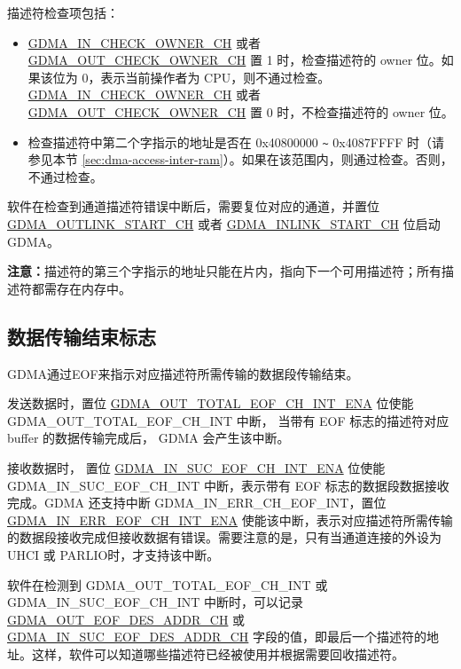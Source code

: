 \documentclass[main\_\_CN.tex]{subfiles}
\begin{document}
描述符检查项包括：
\begin{itemize}
    \item \hyperref[fielddesc:GDMAINCHECKOWNERCHN]{GDMA\_IN\_CHECK\_OWNER\_CH} 或者 \hyperref[fielddesc:GDMAOUTCHECKOWNERCHN]{GDMA\_OUT\_CHECK\_OWNER\_CH} 置 1 时，检查描述符的 owner 位。如果该位为 0，表示当前操作者为 CPU，则不通过检查。\hyperref[fielddesc:GDMAINCHECKOWNERCHN]{GDMA\_IN\_CHECK\_OWNER\_CH} 或者 \hyperref[fielddesc:GDMAOUTCHECKOWNERCHN]{GDMA\_OUT\_CHECK\_OWNER\_CH} 置 0 时，不检查描述符的 owner 位。\\

    \item 检查描述符中第二个字指示的地址是否在 0x40800000 \verb+~+ 0x4087FFFF 时（请参见本节 \ref{sec:dma-access-inter-ram}）。如果在该范围内，则通过检查。否则，不通过检查。\\
\end{itemize}

软件在检查到通道描述符错误中断后，需要复位对应的通道，并置位 \hyperref[fielddesc:GDMAOUTLINKSTARTCHN]{GDMA\_OUTLINK\_START\_CH} 或者  \hyperref[fielddesc:GDMAINLINKSTARTCHN]{GDMA\_INLINK\_START\_CH} 位启动 GDMA。

{\bfseries 注意：}描述符的第三个字指示的地址只能在片内，指向下一个可用描述符；所有描述符都需存在内存中。


\subsection{数据传输结束标志}

GDMA通过EOF来指示对应描述符所需传输的数据段传输结束。

发送数据时，置位 \hyperref[fielddesc:GDMAOUTTOTALEOFCHNINTENA]{GDMA\_OUT\_TOTAL\_EOF\_CH\_INT\_ENA} 位使能  GDMA\_OUT\_TOTAL\_EOF\_CH\_INT 中断， 当带有 EOF 标志的描述符对应 buffer 的数据传输完成后， GDMA 会产生该中断。

接收数据时， 置位 \hyperref[fielddesc:GDMAINSUCEOFCHNINTENA]{GDMA\_IN\_SUC\_EOF\_CH\_INT\_ENA} 位使能 GDMA\_IN\_SUC\_EOF\_CH\_INT 中断，表示带有 EOF 标志的数据段数据接收完成。GDMA 还支持中断 GDMA\_IN\_ERR\_CH\_EOF\_INT，置位 \hyperref[fielddesc:GDMAINERREOFCHNINTENA]{GDMA\_IN\_ERR\_EOF\_CH\_INT\_ENA} 使能该中断，表示对应描述符所需传输的数据段接收完成但接收数据有错误。需要注意的是，只有当通道连接的外设为 UHCI 或 PARLIO时，才支持该中断。

软件在检测到 GDMA\_OUT\_TOTAL\_EOF\_CH\_INT 或 GDMA\_IN\_SUC\_EOF\_CH\_INT 中断时，可以记录 \\\hyperref[fielddesc:GDMAOUTEOFDESADDRCHN]{GDMA\_OUT\_EOF\_DES\_ADDR\_CH} 或 \hyperref[fielddesc:GDMAINSUCEOFDESADDRCHN]{GDMA\_IN\_SUC\_EOF\_DES\_ADDR\_CH} 字段的值，即最后一个描述符的地址。这样，软件可以知道哪些描述符已经被使用并根据需要回收描述符。
\end{document}

